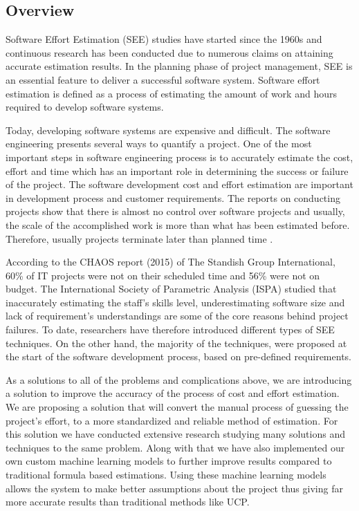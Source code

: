 \subsection{Overview}


Software Effort Estimation (SEE) studies have started since the 1960s and continuous research has been conducted due to numerous claims on attaining accurate
estimation results. In the planning phase
of project management, SEE is an essential feature to deliver a successful software
system. Software effort estimation is defined as a process of estimating the amount of
work and hours required to develop software systems. 

Today, developing software systems are
expensive and difficult. The software engineering presents several ways to quantify a
project. One of the most important steps in software engineering process is to
accurately estimate the cost, effort and time which has an important role in determining
the success or failure of the project. The software development cost and effort
estimation are important in development process and customer requirements. The
reports on conducting projects show that there is almost no control over software
projects and usually, the scale of the accomplished work is more than what has been
estimated before. Therefore, usually projects terminate later than planned time .

According to the CHAOS report (2015) of The Standish Group International,
60\% of IT projects were not on their scheduled time and 56\% were not on budget. The
International Society of Parametric Analysis (ISPA) studied that inaccurately
estimating the staff’s skills level, underestimating software size and lack of
requirement’s understandings are some of the core reasons behind project failures. To date, researchers have therefore introduced different types of SEE
techniques. On the other hand, the majority of the techniques, were proposed at the
start of the software development process, based on pre-defined requirements.

As a solutions to all of the problems and complications above, we are introducing a solution to improve the accuracy of the process of cost and effort estimation. We are proposing a solution that will convert the manual process of guessing the project's effort, to a more standardized and reliable method of estimation. For this solution we have conducted extensive research studying many solutions and techniques to the same problem. Along with that we have also implemented our own custom machine learning models to further improve results compared to traditional formula based estimations. Using these machine learning models allows the system to make better assumptions about the project thus giving far more accurate results than traditional methods like UCP. 

